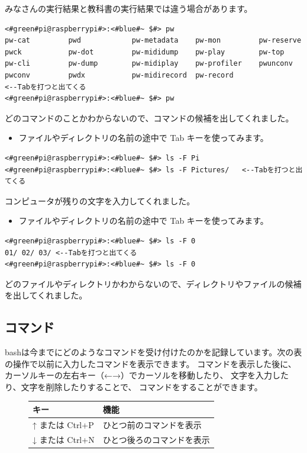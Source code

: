 \documentclass[text03.tex]{subfiles}
\begin{document}
みなさんの実行結果と教科書の実行結果では違う場合があります。
\begin{lstlisting}[caption=Tabの例1, label=Tab1]
<#green#pi@raspberrypi#>:<#blue#~ $#> pw
pw-cat         pwd            pw-metadata    pw-mon         pw-reserve
pwck           pw-dot         pw-mididump    pw-play        pw-top
pw-cli         pw-dump        pw-midiplay    pw-profiler    pwunconv
pwconv         pwdx           pw-midirecord  pw-record                 <--Tabを打つと出てくる
<#green#pi@raspberrypi#>:<#blue#~ $#> pw
\end{lstlisting}
どのコマンドのことかわからないので、コマンドの候補を出してくれました。
\begin{itemize}
\item[<例>]ファイルやディレクトリの名前の途中で Tab キーを使ってみます。
\end{itemize}
\begin{lstlisting}[caption=Tabの例2, label=Tab2]
<#green#pi@raspberrypi#>:<#blue#~ $#> ls -F Pi
<#green#pi@raspberrypi#>:<#blue#~ $#> ls -F Pictures/	<--Tabを打つと出てくる
\end{lstlisting}
コンピュータが残りの文字を入力してくれました。
\begin{itemize}
\item[<例>]ファイルやディレクトリの名前の途中で Tab キーを使ってみます。
\end{itemize}
\begin{lstlisting}[caption=Tabの例3, label=Tab3]
<#green#pi@raspberrypi#>:<#blue#~ $#> ls -F 0
01/	02/	03/	<--Tabを打つと出てくる
<#green#pi@raspberrypi#>:<#blue#~ $#> ls -F 0
\end{lstlisting}
どのファイルやディレクトリかわからないので、ディレクトリやファイルの候補を出してくれました。

\subsection{コマンド}
bashは今までにどのようなコマンドを受け付けたのかを記録しています。次の表の操作で以前に入力したコマンドを表示できます。
コマンドを表示した後に、カーソルキーの左右キー（←→）でカーソルを移動したり、
文字を入力したり、文字を削除したりすることで、
コマンドをすることができます。

\begin{figure}[h]
  \center
  \begin{tabular}{ll}\hline
    キー & 機能 \\ \hline
    ↑ または Ctrl+P & ひとつ前のコマンドを表示\\
    ↓ または Ctrl+N & ひとつ後ろのコマンドを表示\\ \hline
  \end{tabular}
\end{figure}
\end{document}
